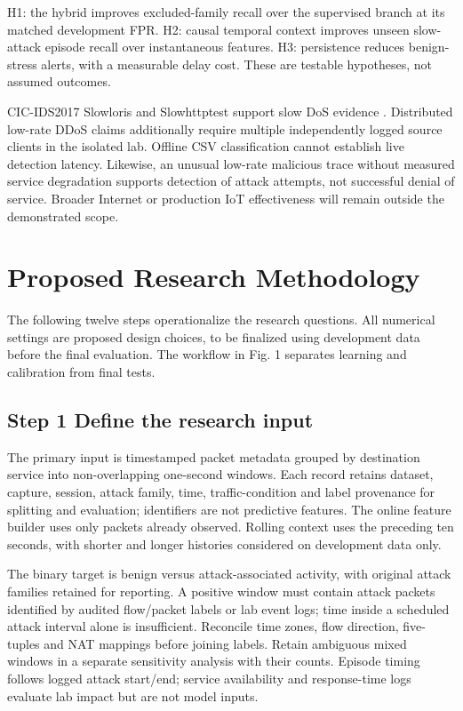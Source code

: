 \documentclass[conference]{IEEEtran}
\begin{document}
H1: the hybrid improves excluded-family recall over the supervised branch at its matched development FPR. H2: causal temporal context improves unseen slow-attack episode recall over instantaneous features. H3: persistence reduces benign-stress alerts, with a measurable delay cost. These are testable hypotheses, not assumed outcomes.

CIC-IDS2017 Slowloris and Slowhttptest support slow DoS evidence \cite{ref12}. Distributed low-rate DDoS claims additionally require multiple independently logged source clients in the isolated lab. Offline CSV classification cannot establish live detection latency. Likewise, an unusual low-rate malicious trace without measured service degradation supports detection of attack attempts, not successful denial of service. Broader Internet or production IoT effectiveness will remain outside the demonstrated scope.

\section{Proposed Research Methodology}
\label{sec:method}
The following twelve steps operationalize the research questions. All numerical settings are proposed design choices, to be finalized using development data before the final evaluation. The workflow in Fig. 1 separates learning and calibration from final tests.

\subsection{Step 1 Define the research input}
The primary input is timestamped packet metadata grouped by destination service into non-overlapping one-second windows. Each record retains dataset, capture, session, attack family, time, traffic-condition and label provenance for splitting and evaluation; identifiers are not predictive features. The online feature builder uses only packets already observed. Rolling context uses the preceding ten seconds, with shorter and longer histories considered on development data only.

The binary target is benign versus attack-associated activity, with original attack families retained for reporting. A positive window must contain attack packets identified by audited flow/packet labels or lab event logs; time inside a scheduled attack interval alone is insufficient. Reconcile time zones, flow direction, five-tuples and NAT mappings before joining labels. Retain ambiguous mixed windows in a separate sensitivity analysis with their counts. Episode timing follows logged attack start/end; service availability and response-time logs evaluate lab impact but are not model inputs.
\end{document}
